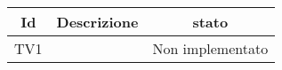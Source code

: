 \begin{center}
	\begin{longtable}{|c|>{\centering}m{7cm}|c|}\hline
		Id & Descrizione & stato \\ \hline
		TV1 &  & Non implementato \\ \hline
	\end{longtable}
\end{center}
